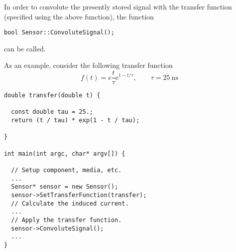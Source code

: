 In order to convolute the presently stored signal with the 
transfer function (specified using the above function), 
the function
\begin{lstlisting}
bool Sensor::ConvoluteSignal();
\end{lstlisting}
can be called. 

As an example, consider the following transfer function
\begin{equation*}
  f\left(t\right) = e\frac{t}{\tau}\text{e}^{1 - t/\tau}, \qquad
  \tau = 25~\text{ns}
\end{equation*}

\begin{lstlisting}
double transfer(double t) {

  const double tau = 25.;
  return (t / tau) * exp(1 - t / tau);

}

int main(int argc, char* argv[]) {

  // Setup component, media, etc.
  ...
  Sensor* sensor = new Sensor();
  sensor->SetTransferFunction(transfer);
  // Calculate the induced current.
  ...
  // Apply the transfer function.
  sensor->ConvoluteSignal();
  ...
}
 
\end{lstlisting}

